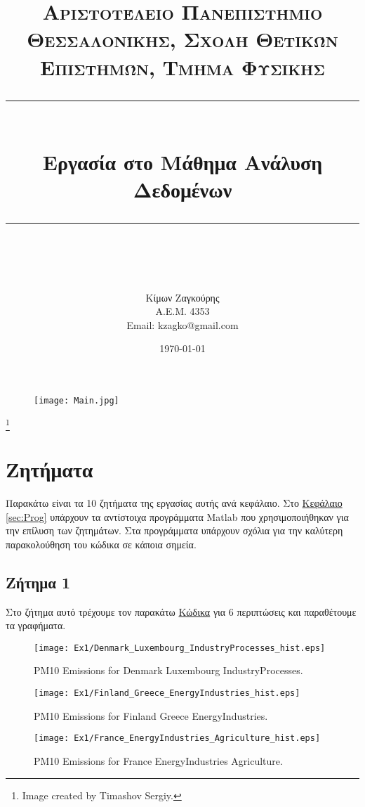 \documentclass[11pt]{scrartcl} %
\title{	
	\normalfont\normalsize
	\textsc{ Αριστοτέλειο Πανεπιστήμιο Θεσσαλονίκης, Σχολή Θετικών Επιστημών, Τμήμα Φυσικής}\\ %
	\vspace{25pt} %
	\rule{\linewidth}{0.5pt}\\ %
	\vspace{20pt} %
	{\huge Εργασία στο Μάθημα Ανάλυση Δεδομένων }\\ %
	\vspace{12pt} %
	\rule{\linewidth}{2pt}\\ %
	\vspace{12pt} %
}
\author{\LARGE Κίμων Ζαγκούρης \\ A.E.M. 4353 \\ Email: kzagko@gmail.com} %
\date{\normalsize\today} %
\begin{document}
\maketitle


\begin{figure}[H]
	\centering
	\texttt{[image: Main.jpg]}
\end{figure}
\footnote{Image created by Timashov Sergiy.}
\newpage


\tableofcontents
\newpage
{}


\section{Ζητήματα}
\label{sec:z}
Παρακάτω είναι τα 10 ζητήματα της εργασίας αυτής ανά κεφάλαιο. Στο \hyperref[sec:Prog]{Κεφάλαιο \ref*{sec:Prog}} υπάρχουν τα αντίστοιχα προγράμματα Matlab που χρησιμοποιήθηκαν για την επίλυση των ζητημάτων. Στα προγράμματα υπάρχουν σχόλια  για την καλύτερη παρακολούθηση του κώδικα σε κάποια σημεία.


\subsection{Ζήτημα 1}
\label{subsec:z1}
Στο ζήτημα αυτό τρέχουμε τον παρακάτω \hyperref[mat:1]{Κώδικα} για 6 περιπτώσεις και παραθέτουμε τα γραφήματα.

\begin{figure}[H] 

	\centering
	\texttt{[image: Ex1/Denmark\_Luxembourg\_IndustryProcesses\_hist.eps]}	
	\caption{PM10 Emissions for Denmark Luxembourg IndustryProcesses. }
	\label{fig:z1}
\end{figure}

\begin{figure}[H] 

	\centering
	\texttt{[image: Ex1/Finland\_Greece\_EnergyIndustries\_hist.eps]}	
	\caption{PM10 Emissions for Finland Greece EnergyIndustries.}
	\label{fig:z2}
\end{figure}

\begin{figure}[H] 

	\centering
	\texttt{[image: Ex1/France\_EnergyIndustries\_Agriculture\_hist.eps]}	
\caption{PM10 Emissions for France EnergyIndustries Agriculture.}
	\label{fig:z3}
\end{figure}
\end{document}
